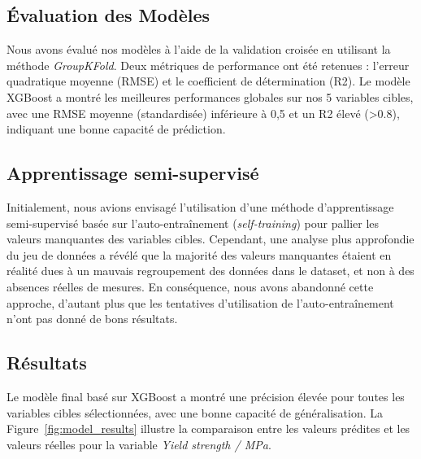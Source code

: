 \documentclass{article}
\begin{document}
\subsection{Évaluation des Modèles}

Nous avons évalué nos modèles à l’aide de la validation croisée en utilisant la méthode \textit{GroupKFold}. Deux métriques de performance ont été retenues : l’erreur quadratique moyenne (RMSE) et le coefficient de détermination (R2). Le modèle XGBoost a montré les meilleures performances globales sur nos 5 variables cibles, avec une RMSE moyenne (standardisée) inférieure à 0,5 et un R2 élevé (>0.8), indiquant une bonne capacité de prédiction.

\subsection{Apprentissage semi-supervisé}

Initialement, nous avions envisagé l’utilisation d’une méthode d’apprentissage semi-supervisé basée sur l’auto-entraînement (\textit{self-training}) pour pallier les valeurs manquantes des variables cibles. Cependant, une analyse plus approfondie du jeu de données a révélé que la majorité des valeurs manquantes étaient en réalité dues à un mauvais regroupement des données dans le dataset, et non à des absences réelles de mesures. En conséquence, nous avons abandonné cette approche, d’autant plus que les tentatives d’utilisation de l’auto-entraînement n’ont pas donné de bons résultats.

\subsection{Résultats}

Le modèle final basé sur XGBoost a montré une précision élevée pour toutes les variables cibles sélectionnées, avec une bonne capacité de généralisation. La Figure~\ref{fig:model_results} illustre la comparaison entre les valeurs prédites et les valeurs réelles pour la variable \textit{Yield strength / MPa}.
\end{document}
